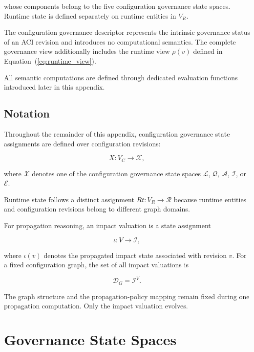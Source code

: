 \documentclass[10pt]{article}
\begin{document}
whose components belong to the five configuration governance state spaces.
Runtime state is defined separately on runtime entities in $V_R$.

The configuration governance descriptor represents the intrinsic governance status of an ACI revision and introduces no computational semantics. The complete governance view additionally includes the runtime view $\rho(v)$ defined in Equation~(\ref{eq:runtime_view}).

All semantic computations are defined through dedicated evaluation functions introduced later in this appendix.

\subsection{Notation}

Throughout the remainder of this appendix, configuration governance state assignments are defined over configuration revisions:

\begin{equation}
	X:V_C\rightarrow\mathcal{X},
	\label{eq:state_assignment}
\end{equation}

where $\mathcal{X}$ denotes one of the configuration governance state spaces
$\mathcal{L}$, $\mathcal{Q}$, $\mathcal{A}$, $\mathcal{I}$, or $\mathcal{E}$.

Runtime state follows a distinct assignment $Rt:V_R\rightarrow\mathcal{R}$ because runtime entities and configuration revisions belong to different graph domains.

For propagation reasoning, an impact valuation is a state assignment

\begin{equation}
	\iota : V \rightarrow \mathcal{I},
	\label{eq:impact_valuation}
\end{equation}

where $\iota(v)$ denotes the propagated impact state associated with revision
$v$. For a fixed configuration graph, the set of all impact valuations is

\begin{equation}
	\mathcal{D}_{G}
	=
	\mathcal{I}^{V}.
	\label{eq:impact_valuation_domain}
\end{equation}

The graph structure and the propagation-policy mapping remain fixed during one
propagation computation. Only the impact valuation evolves.

\section{Governance State Spaces}
\label{appendix:state_spaces}
\end{document}
